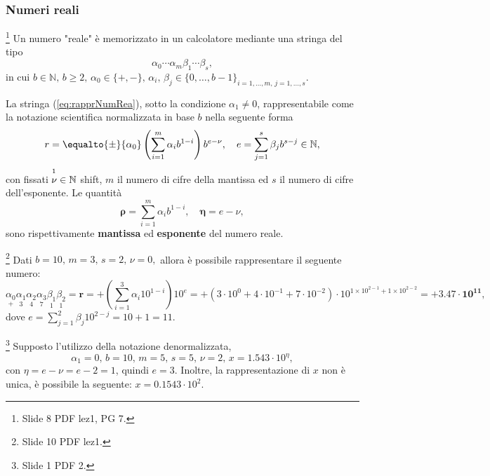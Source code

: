 \subsubsection{Numeri reali}\footnote{Slide 8 PDF lez1, PG 7.}
Un numero "reale" è memorizzato in un calcolatore mediante una stringa del tipo
\begin{equation}\label{eq:rapprNumRea}
	\alpha_0\cdots\alpha_m\beta_1\cdots\beta_s,
\end{equation}
in cui $b\in\mathbb N,\, b\geq 2,\, \alpha_0\in\{+,-\},\, \alpha_i,\,\beta_j\in\{0,\hdots,b-1\}_{i=1,\hdots,m,\, j=1,\hdots,s}.$
\begin{definition}
	La stringa (\ref{eq:rapprNumRea}), sotto la condizione $\alpha_1\neq 0$, rappresentabile come la notazione scientifica normalizzata in base $b$ nella seguente forma
	\begin{equation}\label{eq:rapprSciNorm}
		r=\equalto{\pm}{\alpha_0}\left(\sum_{i=1}^m\alpha_ib^{1-i}\right)b^{e-\nu},\quad e=\sum_{j=1}^s\beta_jb^{s-j}\in\mathbb N,
	\end{equation}
	con fissati $\overset{\footnotemark}{\nu}\in\mathbb N$ shift, $m$ il numero di cifre della mantissa ed $s$ il numero di cifre dell'esponente. Le quantità
	\begin{equation}\label{eq:mantExpRea}
		\boldsymbol\rho = \sum_{i=1}^m\alpha_ib^{1-i},\quad \boldsymbol\eta = e-\nu,
	\end{equation}
	sono rispettivamente \textbf{mantissa} ed \textbf{esponente} del numero reale.
\end{definition}

\begin{example}\footnote{Slide 10 PDF lez1.}
	Dati $b=10,\, m=3,\, s=2,\, \nu=0,$ allora è possibile rappresentare il seguente numero:
	\begin{equation*}
		\underset{+}{\alpha_0}\underset{3}{\alpha_1}\underset{4}{\alpha_2}\underset{7}{\alpha_3}\underset{1}{\beta_1}\underset{1}{\beta_2}=\boldsymbol r=+\left(\sum_{i=1}^3\alpha_i10^{1-i}\right)10^{e}=+(3\cdot 10^0+4\cdot 10^{-1}+7\cdot 10^{-2})\cdot 10^{1\times 10^{2-1} + 1\times 10^{2-2}}=\boldsymbol{+3.47\cdot 10^{11}},
	\end{equation*}
	dove $e=\sum_{j=1}^2\beta_j10^{2-j}=10+1=11.$
\end{example}
\begin{example}
	\footnote{Slide 1 PDF 2.} Supposto l'utilizzo della notazione denormalizzata,
	\begin{equation*}
		\alpha_1=0,\, b=10,\, m=5,\, s=5,\, \nu=2,\, x=1.543\cdot 10^\eta,
	\end{equation*}
	con $\eta=e-\nu=e-2=1$, quindi $e=3$. Inoltre, la rappresentazione di $x$ non è unica, è possibile la seguente: $x=0.1543\cdot 10^2.$ 
\end{example}

